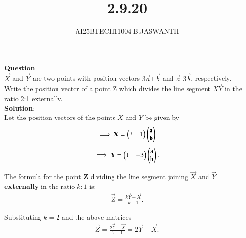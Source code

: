 \documentclass[journal]{IEEEtran}
\begin{document}

\vspace{3cm}


\renewcommand{\thetable}{\theenumi}




\vspace{3cm}


\title{2.9.20}
\author{AI25BTECH11004-B.JASWANTH}
{\let\newpage\relax\maketitle}


\renewcommand{\thefigure}{\theenumi}
\renewcommand{\thetable}{\theenumi}
\setlength{\intextsep}{10pt} %

\textbf{Question}\\
$\vec{X}$ and  $\vec{Y}$ are two points with position vectors $3\vec{a}$+$\vec{b}$  and  $\vec{a}$-$3\vec{b}$, respectively. Write the position vector of a point Z  which divides the line segment  $\vec{XY}$ in the ratio 2:1 externally.\\
\textbf{Solution}:\\
Let the position vectors of the points $X$ and $Y$ be given by
\begin{align}
  \implies  \mathbf{X} = \begin{pmatrix}3 & 1\end{pmatrix}
\begin{pmatrix}\mathbf{a} \\ \mathbf{b}\end{pmatrix}\\
\end{align}
\begin{align}
\implies \mathbf{Y} = 
\begin{pmatrix}1 & -3\end{pmatrix}
\begin{pmatrix}\mathbf{a} \\ \mathbf{b}\end{pmatrix}.
\end{align}

\vspace{1em}

The formula for the point $\mathbf{Z}$ dividing the line segment joining $\vec{X}$ and $\vec{Y}$ \textbf{externally} in the ratio $k:1$ is:
\begin{align}
\vec{Z} = \frac{k\vec{Y} - \vec{X}}{k - 1}.
\end{align}

Substituting $k = 2$ and the above matrices:
\begin{align}
\vec{Z} = \frac{2\vec{Y} - \vec{X}}{2 - 1}
= 2\vec{Y} - \vec{X}.
\end{align}
\end{document}
